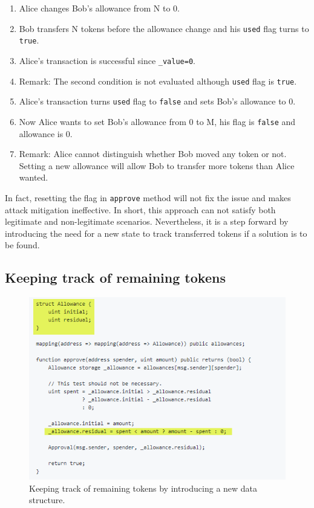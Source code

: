 \begin{enumerate}
	\item Alice changes Bob's allowance from N to 0.
	\item Bob transfers N tokens before the allowance change and his \texttt{used} flag turns to \texttt{true}.
	\item Alice's transaction is successful since \texttt{\_value=0}. 
	\item Remark: The second condition is not evaluated although \texttt{used} flag is \texttt{true}.
	\item Alice's transaction turns \texttt{used} flag to \texttt{false} and sets Bob's allowance to 0. 
	\item Now Alice wants to set Bob's allowance from 0 to M, his flag is \texttt{false} and allowance is 0. 
	\item Remark: Alice cannot distinguish whether Bob moved any token or not. Setting a new allowance will allow Bob to transfer more tokens than Alice wanted.
\end{enumerate}

In fact, resetting the flag in \texttt{approve} method will not fix the issue and makes attack mitigation ineffective. In short, this approach can not satisfy both legitimate and non-legitimate scenarios. Nevertheless, it is a step forward by introducing the need for a new state to track transferred tokens if a solution is to be found.


\subsection{Keeping track of remaining tokens}

\begin{figure}[t]
	\centering
	\includegraphics[width=1.0\linewidth]{figures/multiple_withdrawal_29.png}
	\caption{Keeping track of remaining tokens by introducing a new data structure.\label{fig:track}}
\end{figure}

